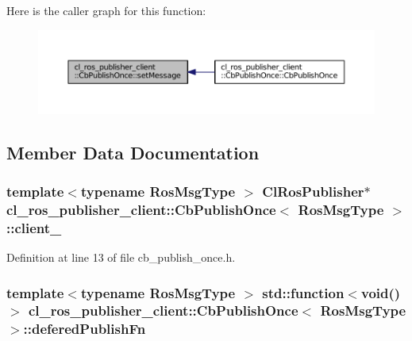 Here is the caller graph for this function\+:
\nopagebreak
\begin{figure}[H]
\begin{center}
\leavevmode
\includegraphics[width=350pt]{classcl__ros__publisher__client_1_1CbPublishOnce_a233a6bd514123ab34f44a6d24c2882dc_icgraph}
\end{center}
\end{figure}




\subsection{Member Data Documentation}
\subsubsection[{\texorpdfstring{client\+\_\+}{client_}}]{\setlength{\rightskip}{0pt plus 5cm}template$<$typename Ros\+Msg\+Type $>$ {\bf Cl\+Ros\+Publisher}$\ast$ {\bf cl\+\_\+ros\+\_\+publisher\+\_\+client\+::\+Cb\+Publish\+Once}$<$ Ros\+Msg\+Type $>$\+::client\+\_\+\hspace{0.3cm}{\ttfamily [private]}}\hypertarget{classcl__ros__publisher__client_1_1CbPublishOnce_a07ba569318a5d5337d9b908cffeab048}{}\label{classcl__ros__publisher__client_1_1CbPublishOnce_a07ba569318a5d5337d9b908cffeab048}


Definition at line 13 of file cb\+\_\+publish\+\_\+once.\+h.

\subsubsection[{\texorpdfstring{defered\+Publish\+Fn}{deferedPublishFn}}]{\setlength{\rightskip}{0pt plus 5cm}template$<$typename Ros\+Msg\+Type $>$ std\+::function$<$void()$>$ {\bf cl\+\_\+ros\+\_\+publisher\+\_\+client\+::\+Cb\+Publish\+Once}$<$ Ros\+Msg\+Type $>$\+::defered\+Publish\+Fn\hspace{0.3cm}{\ttfamily [private]}}\hypertarget{classcl__ros__publisher__client_1_1CbPublishOnce_aeb46259c42303867db8d6821c117f1a3}{}\label{classcl__ros__publisher__client_1_1CbPublishOnce_aeb46259c42303867db8d6821c117f1a3}


